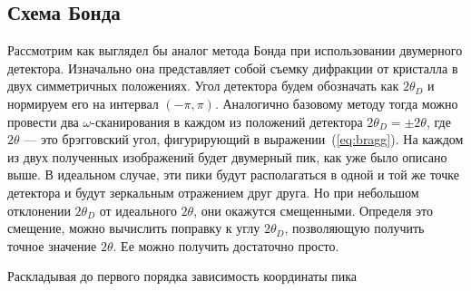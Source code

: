 \subsection{Схема Бонда}

Рассмотрим как выглядел бы аналог метода Бонда при использовании двумерного детектора.
Изначально она представляет собой съемку дифракции от кристалла в двух симметричных положениях.
Угол детектора будем обозначать как $2\theta_D$ и нормируем его на интервал $(-\pi, \pi)$.
Аналогично базовому методу тогда можно провести два $\omega$-сканирования в каждом из положений детектора $2\theta_D = \pm 2\theta$, где $2\theta$ --- это брэгговский угол, фигурирующий в выражении~(\ref{eq:bragg}).
На каждом из двух полученных изображений будет двумерный пик, как уже было описано выше.
В идеальном случае, эти пики будут располагаться в одной и той же точке детектора и будут зеркальным отражением друг друга.
Но при небольшом отклонении $2\theta_D$ от идеального $2\theta$, они окажутся смещенными.
Определя это смещение, можно вычислить поправку к углу $2\theta_D$, позволяющую получить точное значение $2\theta$.
Ее можно получить достаточно просто.


Раскладывая до первого порядка зависимость координаты пика 
